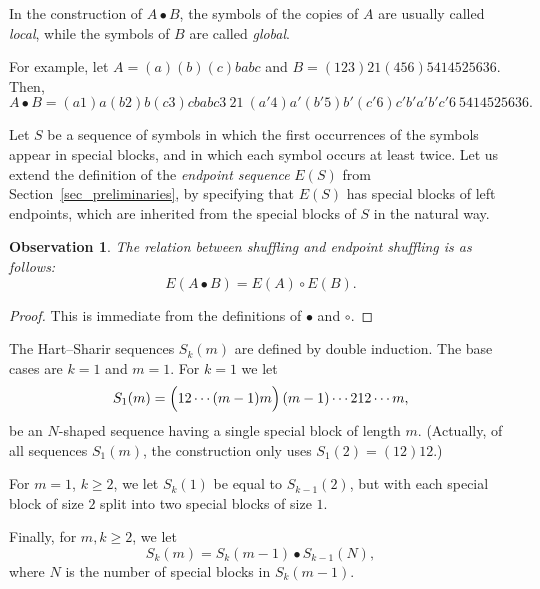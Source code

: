 \documentclass[11pt]{article}
\newtheorem{observation}[theorem]{Observation}
\theoremstyle{definition}
\theoremstyle{remark}
\begin{document}
In the construction of $A\bullet B$, the symbols of the copies of $A$ are usually called \emph{local}, while the symbols of $B$ are called \emph{global}.

For example, let $A = (a)(b)(c)babc$ and $B=(123)21(456)5414525636$. Then,
\begin{equation*}
A\bullet B = (a1)a(b2)b(c3)cbabc3\ 21\ (a'4)a'(b'5)b'(c'6)c'b'a'b'c'6\ 5414525636.
\end{equation*}

Let $S$ be a sequence of symbols in which the first occurrences of the symbols appear in special blocks, and in which each symbol occurs at least twice. Let us extend the definition of the \emph{endpoint sequence} $E(S)$ from Section~\ref{sec_preliminaries}, by specifying that $E(S)$ has special blocks of left endpoints, which are inherited from the special blocks of $S$ in the natural way.

\begin{observation}\label{ref_obs_shuffling}
The relation between shuffling and endpoint shuffling is as follows:
\begin{equation*}
E(A\bullet B) = E(A) \circ E(B).
\end{equation*}
\end{observation}

\begin{proof}
This is immediate from the definitions of $\bullet$ and $\circ$.
\end{proof}

The Hart--Sharir sequences $S_k(m)$ are defined by double induction. The base cases are $k=1$ and $m=1$. For $k=1$ we let
\begin{equation*}
S_1(m) = \Bigl(12\cdots (m-1)m\Bigr)\, (m-1)\cdots 212\cdots m,
\end{equation*}
be an $N$-shaped sequence having a single special block of length $m$. (Actually, of all sequences $S_1(m)$, the construction only uses $S_1(2) = (12)12$.)

For $m=1$, $k\ge 2$, we let $S_k(1)$ be equal to $S_{k-1}(2)$, but with each special block of size $2$ split into two special blocks of size $1$.

Finally, for $m,k\ge 2$, we let
\begin{equation*}
S_k(m) = S_k(m-1) \bullet S_{k-1}(N),
\end{equation*}
where $N$ is the number of special blocks in $S_k(m-1)$.
\end{document}

